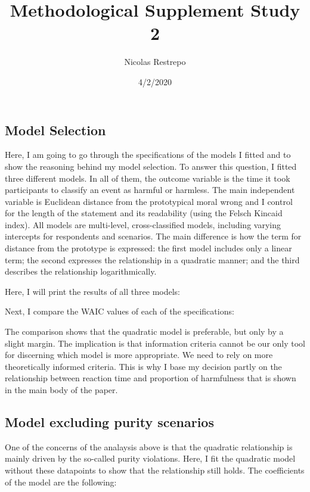 \documentclass[]{article}
\title{Methodological Supplement Study 2}
\author{Nicolas Restrepo}
\date{4/2/2020}
\begin{document}
\maketitle

\hypertarget{model-selection}{%
\subsection{Model Selection}\label{model-selection}}

Here, I am going to go through the specifications of the models I fitted
and to show the reasoning behind my model selection. To answer this
question, I fitted three different models. In all of them, the outcome
variable is the time it took participants to classify an event as
harmful or harmless. The main independent variable is Euclidean distance
from the prototypical moral wrong and I control for the length of the
statement and its readability (using the Felsch Kincaid index). All
models are multi-level, cross-classified models, including varying
intercepts for respondents and scenarios. The main difference is how the
term for distance from the prototype is expressed: the first model
includes only a linear term; the second expresses the relationship in a
quadratic manner; and the third describes the relationship
logarithmically.

Here, I will print the results of all three models:

Next, I compare the WAIC values of each of the specifications:

The comparison shows that the quadratic model is preferable, but only by
a slight margin. The implication is that information criteria cannot be
our only tool for discerning which model is more appropriate. We need to
rely on more theoretically informed criteria. This is why I base my
decision partly on the relationship between reaction time and proportion
of harmfulness that is shown in the main body of the paper.

\hypertarget{model-excluding-purity-scenarios}{%
\subsection{Model excluding purity
scenarios}\label{model-excluding-purity-scenarios}}

One of the concerns of the analaysis above is that the quadratic
relationship is mainly driven by the so-called purity violations. Here,
I fit the quadratic model without these datapoints to show that the
relationship still holds. The coefficients of the model are the
following:
\end{document}
